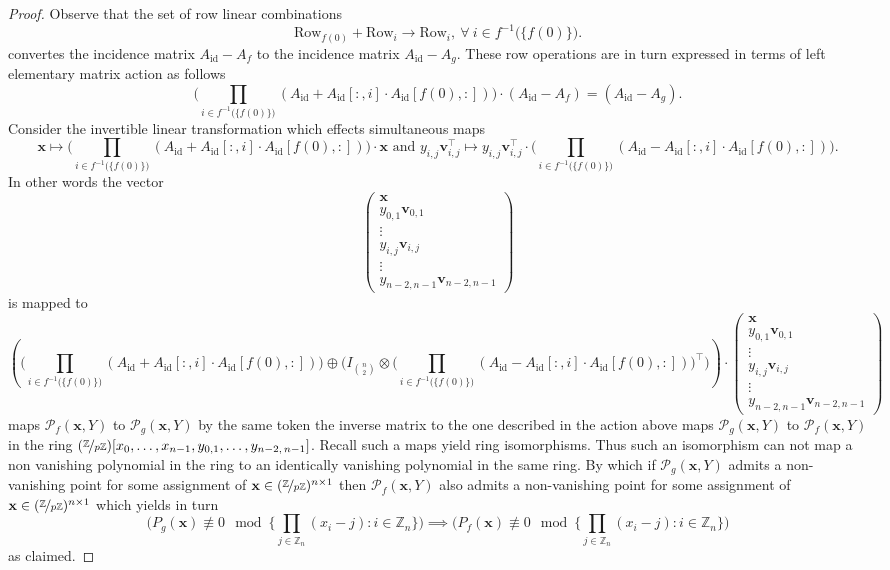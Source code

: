 \begin{proof}
Observe that the set of row linear combinations
\[
\text{Row}_{f(0)}+\text{Row}_{i}\longrightarrow\text{Row}_{i},\ \forall\:i\in f^{-1}\big(\{f(0)\}\big).
\]
convertes the incidence matrix $A_{\text{id}}-A_{f}$ to the incidence matrix $A_{\text{id}}-A_{g}$.
These row operations are in turn expressed in terms of left elementary matrix action as follows
\[
\bigg(\prod_{i\in f^{-1}\big(\{f(0)\}\big)}(A_{\text{id}}+A_{\text{id}}[:,i]\cdot A_{\text{id}}[f(0),:])\bigg)\cdot(A_{\text{id}}-A_{f})=(A_{\text{id}}-A_{g}).
\]
Consider the invertible linear transformation which effects simultaneous maps
\[
\mathbf{x}\mapsto\bigg(\prod_{i\in f^{-1}\big(\{f(0)\}\big)}(A_{\text{id}}+A_{\text{id}}[:,i]\cdot A_{\text{id}}[f(0),:])\bigg)\cdot\mathbf{x}\text{ and }y_{i,j}\mathbf{v}_{i,j}^{\top}\mapsto y_{i,j}\mathbf{v}_{i,j}^{\top}\cdot\bigg(\prod_{i\in f^{-1}\big(\{f(0)\}\big)}(A_{\text{id}}-A_{\text{id}}[:,i]\cdot A_{\text{id}}[f(0),:])\bigg).
\]
In other words the vector
\[
\left(\begin{array}{c}
\mathbf{x}\\
y_{0,1}\mathbf{v}_{0,1}\\
\vdots\\
y_{i,j}\mathbf{v}_{i,j}\\
\vdots\\
y_{n-2,n-1}\mathbf{v}_{n-2,n-1}
\end{array}\right)
\]
is mapped to
\[
\left(\big(\prod_{i\in f^{-1}\big(\{f(0)\}\big)}(A_{\text{id}}+A_{\text{id}}[:,i]\cdot A_{\text{id}}[f(0),:])\big)\oplus\bigg(I_{{n \choose 2}}\otimes\big(\prod_{i\in f^{-1}\big(\{f(0)\}\big)}(A_{\text{id}}-A_{\text{id}}[:,i]\cdot A_{\text{id}}[f(0),:])\big)^{\top}\bigg)\right)\cdot\left(\begin{array}{c}
\mathbf{x}\\
y_{0,1}\mathbf{v}_{0,1}\\
\vdots\\
y_{i,j}\mathbf{v}_{i,j}\\
\vdots\\
y_{n-2,n-1}\mathbf{v}_{n-2,n-1}
\end{array}\right)
\]
maps $\mathcal{P}_{f}(\mathbf{x},Y)$ to $\mathcal{P}_{g}(\mathbf{x},Y)$ by the same token the inverse matrix to the one described in the action above maps  $\mathcal{P}_{g}(\mathbf{x},Y)$ to $\mathcal{P}_{f}(\mathbf{x},Y)$ in the ring $(\nicefrac{\mathbb{Z}}{p\mathbb{Z}})[x_{0},\ldots,x_{n-1},y_{0,1},\ldots ,y_{n-2,\,n-1}]$. Recall such a maps yield ring isomorphisms.
Thus such an isomorphism can not map a non vanishing polynomial in the ring to an identically vanishing polynomial in the same ring. By which if $\mathcal{P}_{g}(\mathbf{x},Y)$ admits a non-vanishing point for some assignment of $\mathbf{x} \in (\nicefrac{\mathbb{Z}}{p\mathbb{Z}})^{n\times 1}$ then $\mathcal{P}_{f}(\mathbf{x},Y)$ also admits a non-vanishing point for some assignment of $\mathbf{x} \in (\nicefrac{\mathbb{Z}}{p\mathbb{Z}})^{n\times 1}$ which yields in turn
\[
\big(P_{g}(\mathbf{x})\not\equiv0\mod\big\{\underset{j\in\mathbb{Z}_{n}}{\prod}(x_{i}-j):i\in\mathbb{Z}_{n}\big\}\big)\implies\big(P_{f}(\mathbf{x})\not\equiv0\mod\big\{\underset{j\in\mathbb{Z}_{n}}{\prod}(x_{i}-j):i\in\mathbb{Z}_{n}\big\}\big)
\]
as claimed.
\end{proof}

